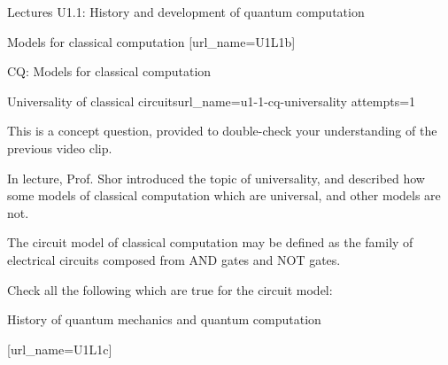 \begin{edXsection}{Lectures U1.1: History and development of quantum computation}
\begin{edXvertical}{Models for classical computation}
[url_name=U1L1b]



\end{edXvertical}


\begin{edXvertical}{CQ: Models for classical computation}

\begin{edXproblem}{Universality of classical circuits}{url_name=u1-1-cq-universality attempts=1}

This is a concept question, provided to double-check your understanding of the previous video clip.

In lecture, Prof. Shor introduced the topic of universality, and
described how some models of classical computation which are
universal, and other models are not.

The circuit model of classical computation may be defined as the
family of electrical circuits composed from AND gates and NOT gates.

Check all the following which are true for the circuit model:


\end{edXproblem}


\end{edXvertical}


\begin{edXvertical}{History of quantum mechanics and quantum computation}

[url_name=U1L1c]


\end{edXvertical}


\end{edXsection}
